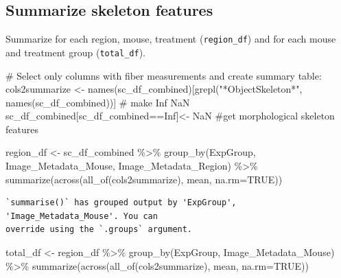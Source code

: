 \documentclass[
  12pt,
  letterpaper,
  DIV=11,
  numbers=noendperiod]{scrartcl}
\newenvironment{Shaded}{\begin{snugshade}}{\end{snugshade}}
\newcommand{\AttributeTok}[1]{\textcolor[rgb]{0.40,0.45,0.13}{#1}}
\newcommand{\CommentTok}[1]{\textcolor[rgb]{0.37,0.37,0.37}{#1}}
\newcommand{\ConstantTok}[1]{\textcolor[rgb]{0.56,0.35,0.01}{#1}}
\newcommand{\FunctionTok}[1]{\textcolor[rgb]{0.28,0.35,0.67}{#1}}
\newcommand{\NormalTok}[1]{\textcolor[rgb]{0.00,0.23,0.31}{#1}}
\newcommand{\OtherTok}[1]{\textcolor[rgb]{0.00,0.23,0.31}{#1}}
\newcommand{\SpecialCharTok}[1]{\textcolor[rgb]{0.37,0.37,0.37}{#1}}
\newcommand{\StringTok}[1]{\textcolor[rgb]{0.13,0.47,0.30}{#1}}
\begin{document}
\hypertarget{summarize-skeleton-features}{%
\subsection{Summarize skeleton
features}\label{summarize-skeleton-features}}

Summarize for each region, mouse, treatment (\texttt{region\_df}) and
for each mouse and treatment group (\texttt{total\_df}).

\begin{Shaded}
\begin{Highlighting}[]
\CommentTok{\# Select only columns with fiber measurements and create summary table:}
\NormalTok{cols2summarize }\OtherTok{\textless{}{-}} \FunctionTok{names}\NormalTok{(sc\_df\_combined)[}\FunctionTok{grepl}\NormalTok{(}\StringTok{"*ObjectSkeleton*"}\NormalTok{, }\FunctionTok{names}\NormalTok{(sc\_df\_combined))] }
\CommentTok{\# make Inf NaN}
\NormalTok{sc\_df\_combined[sc\_df\_combined}\SpecialCharTok{==}\ConstantTok{Inf}\NormalTok{]}\OtherTok{\textless{}{-}} \ConstantTok{NaN}
\CommentTok{\#get morphological skeleton features}

\NormalTok{region\_df }\OtherTok{\textless{}{-}}\NormalTok{ sc\_df\_combined }\SpecialCharTok{\%\textgreater{}\%} 
  \FunctionTok{group\_by}\NormalTok{(ExpGroup, Image\_Metadata\_Mouse, Image\_Metadata\_Region) }\SpecialCharTok{\%\textgreater{}\%}
  \FunctionTok{summarize}\NormalTok{(}\FunctionTok{across}\NormalTok{(}\FunctionTok{all\_of}\NormalTok{(cols2summarize), mean, }\AttributeTok{na.rm=}\ConstantTok{TRUE}\NormalTok{))}
\end{Highlighting}
\end{Shaded}

\begin{verbatim}
`summarise()` has grouped output by 'ExpGroup', 'Image_Metadata_Mouse'. You can
override using the `.groups` argument.
\end{verbatim}

\begin{Shaded}
\begin{Highlighting}[]
\NormalTok{total\_df }\OtherTok{\textless{}{-}}\NormalTok{ region\_df }\SpecialCharTok{\%\textgreater{}\%} 
  \FunctionTok{group\_by}\NormalTok{(ExpGroup, Image\_Metadata\_Mouse) }\SpecialCharTok{\%\textgreater{}\%}
  \FunctionTok{summarize}\NormalTok{(}\FunctionTok{across}\NormalTok{(}\FunctionTok{all\_of}\NormalTok{(cols2summarize), mean, }\AttributeTok{na.rm=}\ConstantTok{TRUE}\NormalTok{))}
\end{Highlighting}
\end{Shaded}
\end{document}
